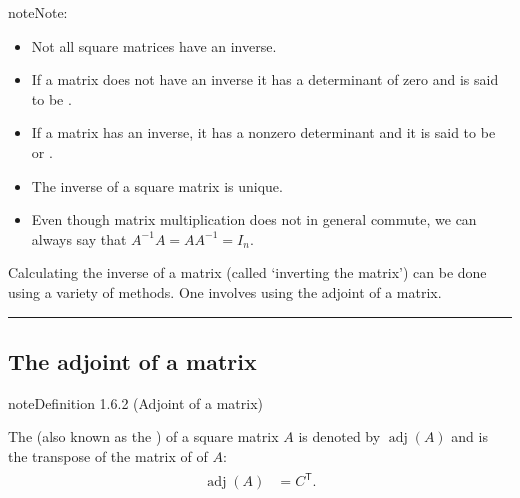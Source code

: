 \documentclass[letterpaper,10pt,english]{jupyterBook}
\begin{document}
\begin{sphinxadmonition}{note}{Note:}\begin{itemize}
\item {} 
\sphinxAtStartPar
Not all square matrices have an inverse.

\item {} 
\sphinxAtStartPar
If a matrix does not have an inverse it has a determinant of zero and is said to be .

\item {} 
\sphinxAtStartPar
If a matrix has an inverse, it has a non\sphinxhyphen{}zero determinant and it is said to be  or .

\item {} 
\sphinxAtStartPar
The inverse of a square matrix is unique.

\item {} 
\sphinxAtStartPar
Even though matrix multiplication does not in general commute, we can always say that \(A^{-1}A = AA^{-1} = I_n\).

\end{itemize}
\end{sphinxadmonition}

\sphinxAtStartPar
Calculating the inverse of a matrix (called ‘inverting the matrix’) can be done using a variety of methods. One involves using the adjoint of a matrix.


\bigskip\hrule\bigskip


\ignorespaces 

\subsection{The adjoint of a matrix}
\label{\detokenize{_pages/1.5_Inverse_matrix:the-adjoint-of-a-matrix}}\label{\detokenize{_pages/1.5_Inverse_matrix:index-1}}\label{_pages/1.5_Inverse_matrix:adjoint-definition}
\begin{sphinxadmonition}{note}{Definition 1.6.2 (Adjoint of a matrix)}



\sphinxAtStartPar
The  (also known as the ) of a square matrix \(A\) is denoted by \(\operatorname{adj}(A)\) and is the transpose of the matrix of {\hyperref[\detokenize{_pages/1.4_Determinants:cofactor-definition}]{}} of \(A\):
\begin{equation}\label{equation:_pages/1.5_Inverse_matrix:adjoint-equation}
\begin{split} \begin{align*}
    \operatorname{adj}(A) &= C^\mathsf{T}.
\end{align*} \end{split}
\end{equation}\end{sphinxadmonition}
\end{document}
